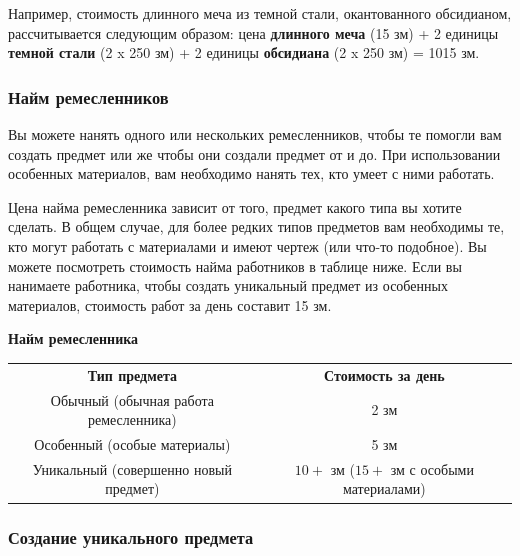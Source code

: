 \documentclass[a4paper, 9pt, twocolumn]{book}
\begin{document}
	Например, стоимость длинного меча из темной стали, окантованного обсидианом, рассчитывается следующим образом: цена \textbf{длинного меча} (15 зм) + 2 единицы \textbf{темной стали} (2 x 250 зм) + 2 единицы \textbf{обсидиана} (2 x 250 зм) = 1015 зм.
	
	\subsubsection{Найм ремесленников}
	
	Вы можете нанять одного или нескольких ремесленников, чтобы те помогли вам создать предмет или же чтобы они создали предмет от и до. При использовании особенных материалов, вам необходимо нанять тех, кто умеет с ними работать.
	
	Цена найма ремесленника зависит от того, предмет какого типа вы хотите сделать. В общем случае, для более редких типов предметов вам необходимы те, кто могут работать с материалами и имеют чертеж (или что-то подобное). Вы можете посмотреть стоимость найма работников в таблице ниже. Если вы нанимаете работника, чтобы создать уникальный предмет из особенных материалов, стоимость работ за день составит 15 зм.
	
	\begin{table}[H]
		
		{\Large \textbf{Найм ремесленника}}
		
		\medspace
		
		\centering
		
		\begin{tabularx}{\linewidth}{C C}
			
			\textbf{Тип предмета} & \textbf{Стоимость за день} \\
			
			Обычный (обычная работа ремесленника) & 2 зм \\
			
			Особенный (особые материалы) & 5 зм \\
			
			Уникальный (совершенно новый предмет) & $10+$ зм ($15+$ зм с особыми материалами) \\
			
		\end{tabularx}
	\end{table}
	
	
	\subsubsection{Создание уникального предмета}
	
\end{document}
